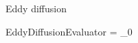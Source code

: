 Eddy diffusion 
\begin{equationCode}{EddyDiffusionEvaluator}
\eddy = \eddy_0  
\label{Titan:eddy_diff}
\end{equationCode}
